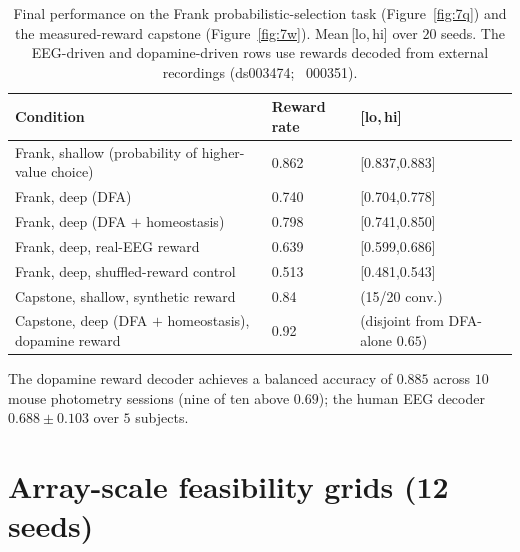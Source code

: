 \begin{table}[H]
    \caption[Source data: Frank task and dopamine capstone (Figs.~\ref{fig:7q},~\ref{fig:7w}).]{Final
    performance on the Frank probabilistic-selection task (Figure~\ref{fig:7q}) and the
    measured-reward capstone (Figure~\ref{fig:7w}). Mean\,[lo,\,hi] over $20$ seeds.
    The EEG-driven and dopamine-driven rows use rewards decoded from external
    recordings (ds003474; ~000351).}
    \begin{center}
    \footnotesize
    \begin{tabularx}{\textwidth}{@{}X Y Y@{}}
    \toprule
    Condition & Reward rate & [lo,\,hi] \\
    \midrule
    Frank, shallow (probability of higher-value choice) & 0.862 & \tiny[0.837,0.883] \\
    Frank, deep (DFA)                                   & 0.740 & \tiny[0.704,0.778] \\
    Frank, deep (DFA $+$ homeostasis)                   & 0.798 & \tiny[0.741,0.850] \\
    Frank, deep, real-EEG reward                        & 0.639 & \tiny[0.599,0.686] \\
    Frank, deep, shuffled-reward control                & 0.513 & \tiny[0.481,0.543] \\
    Capstone, shallow, synthetic reward                 & 0.84  & \tiny(15/20 conv.) \\
    Capstone, deep (DFA $+$ homeostasis), dopamine reward & 0.92 & \tiny(disjoint from DFA-alone $0.65$) \\
    \bottomrule
    \end{tabularx}
    \label{table:E6c}
    \end{center}
    \vspace{0.2em}
    \noindent\footnotesize The dopamine reward decoder achieves a balanced accuracy of
    $0.885$ across $10$ mouse photometry sessions (nine of ten above $0.69$); the human
    EEG decoder $0.688\pm0.103$ over $5$ subjects.
\end{table}

\section{Array-scale feasibility grids (12 seeds)}

